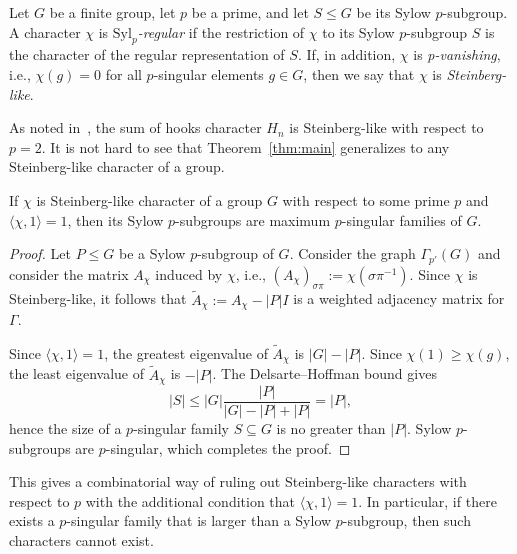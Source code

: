 \documentclass[12pt]{article}
\begin{document}
\begin{definition}
Let $G$ be a finite group, let $p$ be a prime, and let $S \leq G$ be its Sylow $p$-subgroup. A character $\chi$ is \emph{$\mathrm{Syl}_p$-regular} if the restriction of $\chi$ to its Sylow $p$-subgroup $S$ is the character of the regular representation of $S$.  If, in addition, $\chi$ is \emph{p-vanishing}, i.e., $\chi(g) = 0$ for all $p$-singular elements $g \in G$, then we say that $\chi$ is \emph{Steinberg-like}.
\end{definition}
\noindent As noted in~\cite{MalleZ20}, the sum of hooks character $H_n$ is Steinberg-like with respect to $p=2$. 
\noindent It is not hard to see that Theorem~\ref{thm:main} generalizes to any Steinberg-like character of a group.
\begin{theorem}\label{thm:main2}
If $\chi$ is Steinberg-like character of a group $G$ with respect to some prime $p$ and $\langle \chi, 1 \rangle = 1$, then its Sylow $p$-subgroups are maximum $p$-singular families of $G$.
\end{theorem}
\begin{proof}
Let $P \leq G$ be a Sylow $p$-subgroup of $G$. Consider the graph $\Gamma_{p'}(G)$ and consider the matrix $A_\chi$ induced by $\chi$, i.e., $(A_\chi)_{\sigma \pi} := \chi(\sigma \pi^{-1})$. Since $\chi$ is Steinberg-like, it follows that $\tilde{A}_\chi := A_\chi - |P| I$ is a weighted adjacency matrix for $\Gamma$.  

Since $\langle \chi, 1 \rangle = 1$, the greatest eigenvalue of $\tilde{A}_\chi $ is $|G|-|P|$. Since $\chi(1) \geq \chi(g)$, the least eigenvalue of $\tilde{A}_\chi$ is $-|P|$. The Delsarte--Hoffman bound gives
\[
	|S| \leq |G| \frac{|P|}{|G|-|P| + |P| } = |P|,
\]
hence the size of a $p$-singular family $S \subseteq G$ is no greater than $|P|$. Sylow $p$-subgroups are $p$-singular, which completes the proof.
\end{proof}
\noindent This gives a combinatorial way of ruling out Steinberg-like characters with respect to $p$ with the additional condition that $\langle \chi, 1 \rangle = 1$. In particular, if there exists a $p$-singular family that is larger than a Sylow $p$-subgroup, then such characters cannot exist. 
\end{document}
